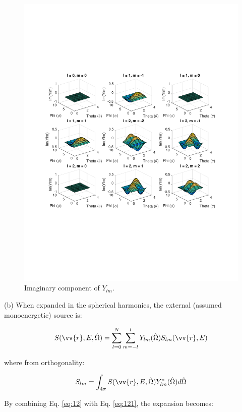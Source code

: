 \documentclass[10pt]{article}
\begin{document}
\clearpage
\begin{figure}[H]
  \centering
  \includegraphics[width=15cm]{Imag_Ylm.pdf}
  \caption{Imaginary component of \(Y_{lm}\).}
  \label{fig:imag}
\end{figure}

\clearpage
(b) When expanded in the spherical harmonics, the external (assumed monoenergetic) source is:

\begin{equation}
\label{eq:12}
S(\vv{r},E,\hat{\Omega})=\sum_{l=0}^{N}\sum_{m=-l}^{l}Y_{lm}(\hat{\Omega})S_{lm}(\vv{r},E)
\end{equation}

where from orthogonality:

\begin{equation}
\label{eq:121}
S_{lm}=\int_{4\pi}^{}S(\vv{r},E,\hat{\Omega})Y_{lm}^{*}(\hat{\Omega})d\hat{\Omega}
\end{equation}

By combining Eq. \eqref{eq:12} with Eq. \eqref{eq:121}, the expansion becomes:
\end{document}
